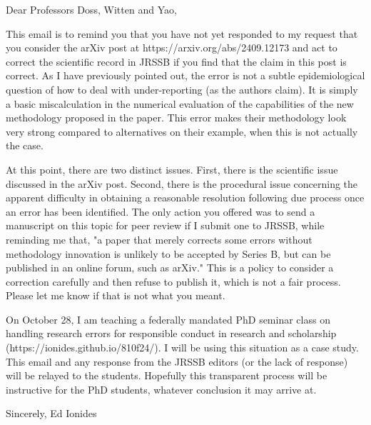 \documentclass[11pt]{article}
\begin{document}
{\selectfont

Dear Professors Doss, Witten and Yao,

This email is to remind you that you have not yet responded to my request that you consider the arXiv post at https://arxiv.org/abs/2409.12173 and act to correct the scientific record in JRSSB if you find that the claim in this post is correct. As I have previously pointed out, the error is not a subtle epidemiological question of how to deal with under-reporting (as the authors claim). It is simply a basic miscalculation in the numerical evaluation of the capabilities of the new methodology proposed in the paper. This error makes their methodology look very strong compared to alternatives on their example, when this is not actually the case. 

At this point, there are two distinct issues. First, there is the scientific issue discussed in the arXiv post. Second, there is the procedural issue concerning the apparent difficulty in obtaining a reasonable resolution following due process once an error has been identified. The only action you offered was to send a manuscript on this topic for peer review if I submit one to JRSSB, while reminding me that, "a paper that merely corrects some errors without methodology innovation is unlikely to be accepted by Series B, but can be published in an online forum, such as arXiv." This is a policy to consider a correction carefully and then refuse to publish it, which is not a fair process. Please let me know if that is not what you meant.

On October 28, I am teaching a federally mandated PhD seminar class on handling research errors for responsible conduct in research and scholarship (https://ionides.github.io/810f24/). I will be using this situation as a case study. This email and any response from the JRSSB editors (or the lack of response) will be relayed to the students. Hopefully this transparent process will be instructive for the PhD students, whatever conclusion it may arrive at.

Sincerely,
Ed Ionides

}
\end{document}
